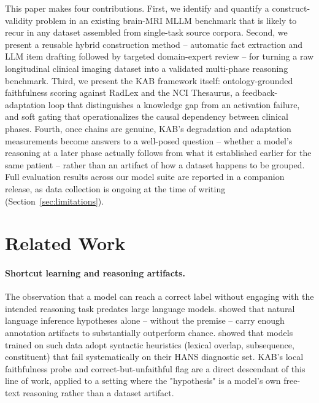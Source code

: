 \documentclass[11pt]{article}
\begin{document}
This paper makes four contributions. First, we identify and quantify a construct-validity problem in an existing brain-MRI MLLM benchmark that is likely to recur in any dataset assembled from single-task source corpora. Second, we present a reusable hybrid construction method -- automatic fact extraction and LLM item drafting followed by targeted domain-expert review -- for turning a raw longitudinal clinical imaging dataset into a validated multi-phase reasoning benchmark. Third, we present the KAB framework itself: ontology-grounded faithfulness scoring against RadLex and the NCI Thesaurus, a feedback-adaptation loop that distinguishes a knowledge gap from an activation failure, and soft gating that operationalizes the causal dependency between clinical phases. Fourth, once chains are genuine, KAB's degradation and adaptation measurements become answers to a well-posed question -- whether a model's reasoning at a later phase actually follows from what it established earlier for the same patient -- rather than an artifact of how a dataset happens to be grouped. Full evaluation results across our model suite are reported in a companion release, as data collection is ongoing at the time of writing (Section~\ref{sec:limitations}).

\section{Related Work}
\label{sec:related-work}

\paragraph{Shortcut learning and reasoning artifacts.} The observation that a model can reach a correct label without engaging with the intended reasoning task predates large language models. \citet{gururangan2018annotation} showed that natural language inference hypotheses alone -- without the premise -- carry enough annotation artifacts to substantially outperform chance. \citet{mccoy2019right} showed that models trained on such data adopt syntactic heuristics (lexical overlap, subsequence, constituent) that fail systematically on their HANS diagnostic set. KAB's local faithfulness probe and correct-but-unfaithful flag are a direct descendant of this line of work, applied to a setting where the "hypothesis" is a model's own free-text reasoning rather than a dataset artifact.
\end{document}
